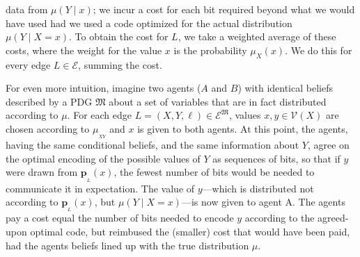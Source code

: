 \documentclass{article}
\theoremstyle{plain}
\theoremstyle{definition}
\theoremstyle{remark}
\newcommand\mat[1]{\mathbf{#1}}
\newcommand{\bp}[1][L]{\mat{p}_{\!_{#1}\!}}
\newcommand{\V}{\mathcal V}
\newcommand{\Ed}{\mathcal E}
\newcommand{\dg}[1]{\mathfrak{#1}}
\numberwithin{equation}{section}
\begin{document}
{%
        data from $\mu(Y\mid x)$; we incur a cost for each bit
        required beyond what we would have used had we used a code
                optimized for the actual distribution $\mu(Y\mid X=x)$.  
       To obtain the cost for $L$, we take a weighted average of these costs, where the weight for the value $x$ is the probability $\mu_X(x)$. We do this for every edge $L \in \Ed$, summing the cost.

	For even more intuition, imagine two agents ($A$ and $B$) with identical
        beliefs described by a PDG $\dg M$ about a set of variables
        that are in fact 
        distributed according to $\mu$. For each edge $L = (X,Y, \ell)
        \in \Ed^\dg M$, values $x,y \in \V(X)$ are chosen according to
               $\mu_{_{XY}}$ and $x$ is given to both
        agents. 
		At this point, the agents, having the same conditional beliefs, and
		the same information about $Y$, agree on the optimal encoding 
		of the possible values of $Y$ as sequences of bits, so that if $y$
		were drawn from $\bp(x)$, the fewest number of bits would be needed
		to communicate it in expectation. The value of $y$---which is distributed
		not according to $\bp(x)$, but $\mu(Y \mid X=x)$---is now given to agent A.
		The agents pay a cost equal the number of bits needed to encode $y$ according
		to the agreed-upon optimal code, but reimbused the (smaller) cost that would have been paid,
		had the agents beliefs lined up with the true distribution $\mu$.
		
}
\end{document}
